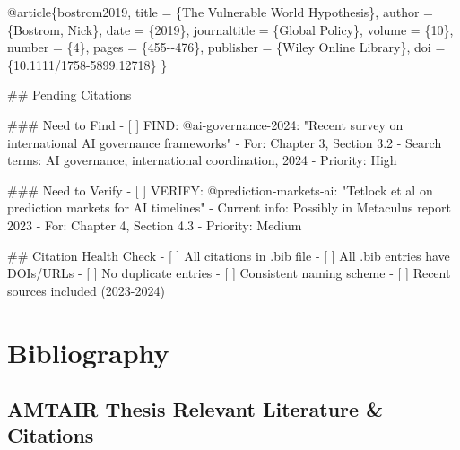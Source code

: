 \documentclass[
  11pt,
  letterpaper,
]{book}
\newenvironment{Shaded}{\begin{snugshade}}{\end{snugshade}}
\newcommand{\FunctionTok}[1]{\textcolor[rgb]{0.28,0.35,0.67}{#1}}
\newcommand{\NormalTok}[1]{\textcolor[rgb]{0.00,0.23,0.31}{#1}}
\newcommand{\SpecialStringTok}[1]{\textcolor[rgb]{0.13,0.47,0.30}{#1}}
\newcommand{\VariableTok}[1]{\textcolor[rgb]{0.07,0.07,0.07}{#1}}
\begin{document}
\begin{Shaded}
\begin{Highlighting}[]
\NormalTok{@article\{bostrom2019,}
\NormalTok{  title = \{The Vulnerable World Hypothesis\},}
\NormalTok{  author = \{Bostrom, Nick\},}
\NormalTok{  date = \{2019\},}
\NormalTok{  journaltitle = \{Global Policy\},}
\NormalTok{  volume = \{10\},}
\NormalTok{  number = \{4\},}
\NormalTok{  pages = \{455{-}{-}476\},}
\NormalTok{  publisher = \{Wiley Online Library\},}
\NormalTok{  doi = \{10.1111/1758{-}5899.12718\}}
\NormalTok{\}}




\FunctionTok{\#\# Pending Citations}

\FunctionTok{\#\#\# Need to Find}
\SpecialStringTok{{-} }\VariableTok{[ ]}\NormalTok{ FIND: @ai{-}governance{-}2024: "Recent survey on international AI governance frameworks"}
\SpecialStringTok{  {-} }\NormalTok{For: Chapter 3, Section 3.2}
\SpecialStringTok{  {-} }\NormalTok{Search terms: AI governance, international coordination, 2024}
\SpecialStringTok{  {-} }\NormalTok{Priority: High}

\FunctionTok{\#\#\# Need to Verify}
\SpecialStringTok{{-} }\VariableTok{[ ]}\NormalTok{ VERIFY: @prediction{-}markets{-}ai: "Tetlock et al on prediction markets for AI timelines"}
\SpecialStringTok{  {-} }\NormalTok{Current info: Possibly in Metaculus report 2023}
\SpecialStringTok{  {-} }\NormalTok{For: Chapter 4, Section 4.3}
\SpecialStringTok{  {-} }\NormalTok{Priority: Medium}


\FunctionTok{\#\# Citation Health Check}
\SpecialStringTok{{-} }\VariableTok{[ ]}\NormalTok{ All citations in .bib file}
\SpecialStringTok{{-} }\VariableTok{[ ]}\NormalTok{ All .bib entries have DOIs/URLs}
\SpecialStringTok{{-} }\VariableTok{[ ]}\NormalTok{ No duplicate entries}
\SpecialStringTok{{-} }\VariableTok{[ ]}\NormalTok{ Consistent naming scheme}
\SpecialStringTok{{-} }\VariableTok{[ ]}\NormalTok{ Recent sources included (2023{-}2024)}

\end{Highlighting}
\end{Shaded}


\chapter*{Bibliography}\label{bibliography}



\section{AMTAIR Thesis Relevant Literature \&
Citations}\label{amtair-thesis-relevant-literature-citations-1}
\end{document}
